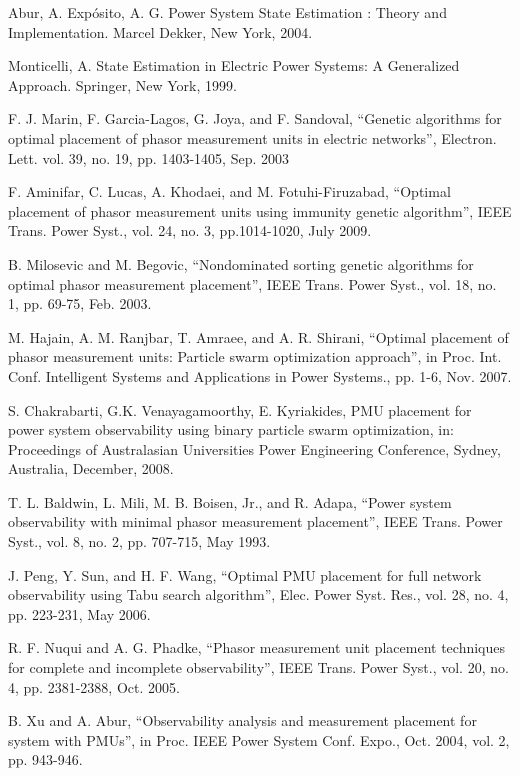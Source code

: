 \documentclass[12pt]{article}
\begin{document}
\begin{thebibliography}{99}
	 Abur, A. Expósito, A. G. Power System State Estimation : Theory and Implementation. Marcel Dekker, New York, 2004.
	
	 Monticelli, A. State Estimation in Electric Power Systems: A Generalized Approach. Springer, New York, 1999.
	
	 F. J. Marin, F. Garcia-Lagos, G. Joya, and F. Sandoval, “Genetic algorithms for optimal placement of phasor measurement units in electric networks”, Electron. Lett. vol. 39, no. 19, pp. 1403-1405, Sep. 2003
	
	 F. Aminifar, C. Lucas, A. Khodaei, and M. Fotuhi-Firuzabad, “Optimal placement of phasor measurement units using immunity genetic algorithm”, IEEE Trans. Power Syst., vol. 24, no. 3, pp.1014-1020, July 2009. 
	
	  B. Milosevic and M. Begovic, “Nondominated sorting genetic algorithms for optimal phasor measurement placement”, IEEE Trans. Power Syst., vol. 18, no. 1, pp. 69-75, Feb. 2003. 
	
	  M. Hajain, A. M. Ranjbar, T. Amraee, and A. R. Shirani, “Optimal placement of phasor measurement units: Particle swarm optimization approach”, in Proc. Int. Conf. Intelligent Systems and Applications in Power Systems., pp. 1-6, Nov. 2007.
	
	 S. Chakrabarti, G.K. Venayagamoorthy, E. Kyriakides, PMU placement for power system observability using binary particle swarm optimization, in: Proceedings
	of Australasian Universities Power Engineering Conference, Sydney, Australia,
	December, 2008.
	
	 T. L. Baldwin, L. Mili, M. B. Boisen, Jr., and R. Adapa, “Power system observability with minimal phasor measurement placement”, IEEE Trans. Power Syst., vol. 8, no. 2, pp. 707-715, May 1993.
	
	 J. Peng, Y. Sun, and H. F. Wang, “Optimal PMU placement for full network observability using Tabu search algorithm”, Elec. Power Syst. Res., vol. 28, no. 4, pp. 223-231, May 2006. 
	
	 R. F. Nuqui and A. G. Phadke, “Phasor measurement unit placement techniques for complete and incomplete observability”, IEEE Trans. Power Syst., vol. 20, no. 4, pp. 2381-2388, Oct. 2005.
	
	 B. Xu and A. Abur, “Observability analysis and measurement placement for system with PMUs”, in Proc. IEEE Power System Conf. Expo., Oct. 2004, vol. 2, pp. 943-946.
	

\end{thebibliography}
\end{document}
